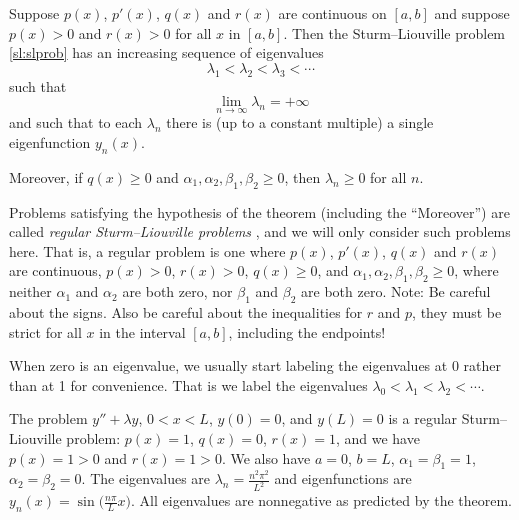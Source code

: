 \documentclass{ximera}
\begin{document}
\begin{theorem} \label{sl:slregthm}
    Suppose $p(x)$, $p'(x)$, $q(x)$ and $r(x)$ are continuous on $[a,b]$ and suppose $p(x) > 0$ and $r(x) > 0$ for all $x$ in $[a,b]$. Then the Sturm--Liouville problem \eqref{sl:slprob} has an increasing sequence of eigenvalues
    \begin{equation*}
        \lambda_1 < \lambda_2 < \lambda_3 < \cdots 
    \end{equation*}
    such that
    \begin{equation*}
        \lim_{n \to \infty} \lambda_n = +\infty
    \end{equation*}
    and such that to each $\lambda_n$ there is (up to a constant multiple) a single eigenfunction $y_n(x)$. 
    
    Moreover, if $q(x) \geq 0$ and $\alpha_1, \alpha_2, \beta_1, \beta_2 \geq 0$, then $\lambda_n \geq 0$ for all $n$.
\end{theorem}

Problems satisfying the hypothesis of the theorem (including the ``Moreover'') are called \emph{regular Sturm--Liouville problems}%
, and we will only consider such problems here. That is, a regular problem is one where $p(x)$, $p'(x)$, $q(x)$ and $r(x)$ are continuous, $p(x) > 0$, $r(x) > 0$, $q(x) \geq 0$, and $\alpha_1, \alpha_2, \beta_1, \beta_2 \geq 0$, where neither $\alpha_1$ and $\alpha_2$ are both zero, nor $\beta_1$ and $\beta_2$ are both zero. Note: Be careful about the signs.  Also be careful about the inequalities for $r$ and $p$, they must be strict for all $x$ in the interval $[a,b]$, including the endpoints!

When zero is an eigenvalue, we usually start labeling the eigenvalues at 0 rather than at 1 for convenience. That is we label the eigenvalues $\lambda_0 < \lambda_1 < \lambda_2 < \cdots$.

\begin{example}
    The problem $y''+\lambda y$, $0 < x < L$, $y(0) = 0$, and $y(L) = 0$ is a regular Sturm--Liouville problem:  $p(x) = 1$, $q(x) = 0$, $r(x) = 1$, and we have $p(x) = 1 > 0$ and $r(x) = 1 > 0$.  We also have $a=0$, $b=L$, $\alpha_1 = \beta_1 = 1$, $\alpha_2 = \beta_2 = 0$. The eigenvalues are $\lambda_n = \frac{n^2 \pi^2}{L^2}$ and eigenfunctions are $y_n(x) = \sin\bigl(\frac{n\pi}{L} x\bigr)$.  All eigenvalues are nonnegative as predicted by the theorem.
\end{example}
\end{document}
